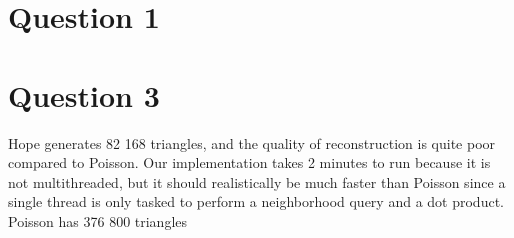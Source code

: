 \documentclass[a4paper]{article}
\begin{document}





\section*{Question 1}

\section*{Question 3}
Hope generates 82 168 triangles, and the quality of
reconstruction is quite poor compared to Poisson. Our implementation takes
2 minutes to run because it is not multithreaded, but it should realistically
be much faster than Poisson since a single thread is only tasked to perform
a neighborhood query and a dot product. Poisson has 376 800 triangles
\end{document}
